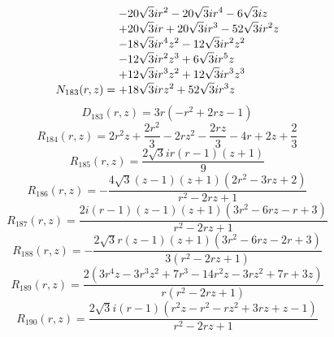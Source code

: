 \documentclass[11pt,a4paper]{article}
\begin{document}
\begin{equation}
N_{183}(r,z)=\shortstack[l]{$\displaystyle  - 20 \sqrt{3} i r^{2} - 20 \sqrt{3} i r^{4} - 6 \sqrt{3} i z$\\
$\displaystyle  + 20 \sqrt{3} i r + 20 \sqrt{3} i r^{3} - 52 \sqrt{3} i r^{2} z$\\
$\displaystyle  - 18 \sqrt{3} i r^{4} z^{2} - 12 \sqrt{3} i r^{2} z^{2}$\\
$\displaystyle  - 12 \sqrt{3} i r^{2} z^{3} + 6 \sqrt{3} i r^{5} z$\\
$\displaystyle  + 12 \sqrt{3} i r^{3} z^{2} + 12 \sqrt{3} i r^{3} z^{3}$\\
$\displaystyle  + 18 \sqrt{3} i r z^{2} + 52 \sqrt{3} i r^{3} z$}
\label{eq:cat-numerator-183}
\end{equation}
\begin{equation}
D_{183}(r,z)=3 r \left(- r^{2} + 2 r z - 1\right)
\label{eq:cat-denominator-183}
\end{equation}
\begin{equation}
R_{184}(r,z)=2 r^{2} z + \frac{2 r^{2}}{3} - 2 r z^{2} - \frac{2 r z}{3} - 4 r + 2 z + \frac{2}{3}
\label{eq:cat-rational-184}
\end{equation}
\begin{equation}
R_{185}(r,z)=\frac{2 \sqrt{3} i r \left(r - 1\right) \left(z + 1\right)}{9}
\label{eq:cat-rational-185}
\end{equation}
\begin{equation}
R_{186}(r,z)=- \frac{4 \sqrt{3} \left(z - 1\right) \left(z + 1\right) \left(2 r^{2} - 3 r z + 2\right)}{r^{2} - 2 r z + 1}
\label{eq:cat-rational-186}
\end{equation}
\begin{equation}
R_{187}(r,z)=\frac{2 i \left(r - 1\right) \left(z - 1\right) \left(z + 1\right) \left(3 r^{2} - 6 r z - r + 3\right)}{r^{2} - 2 r z + 1}
\label{eq:cat-rational-187}
\end{equation}
\begin{equation}
R_{188}(r,z)=- \frac{2 \sqrt{3} r \left(z - 1\right) \left(z + 1\right) \left(3 r^{2} - 6 r z - 2 r + 3\right)}{3 \left(r^{2} - 2 r z + 1\right)}
\label{eq:cat-rational-188}
\end{equation}
\begin{equation}
R_{189}(r,z)=\frac{2 \left(3 r^{4} z - 3 r^{3} z^{2} + 7 r^{3} - 14 r^{2} z - 3 r z^{2} + 7 r + 3 z\right)}{r \left(r^{2} - 2 r z + 1\right)}
\label{eq:cat-rational-189}
\end{equation}
\begin{equation}
R_{190}(r,z)=\frac{2 \sqrt{3} i \left(r - 1\right) \left(r^{2} z - r^{2} - r z^{2} + 3 r z + z - 1\right)}{r^{2} - 2 r z + 1}
\label{eq:cat-rational-190}
\end{equation}
\end{document}
